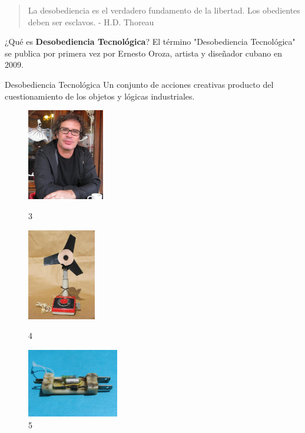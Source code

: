 \documentclass[spanish]{beamer}
\begin{document}
\begin{frame}{}
    \begin{quote}
        La desobediencia es el verdadero fundamento de la libertad. Los obedientes deben ser esclavos. - H.D. Thoreau
    \end{quote}
\end{frame}

\begin{frame}{¿Qué es \textbf{Desobediencia Tecnológica}?}
    El término "Desobediencia Tecnológica" se publica por primera vez por Ernesto Oroza, artista y diseñador cubano en 2009.
    \begin{block}{Desobediencia Tecnológica}
        Un conjunto de acciones creativas producto del cuestionamiento de los objetos y lógicas industriales.    
    \end{block}
    \vspace{0.3cm}
    
    \centering
    \begin{figure}      
            \includegraphics[height=4cm]{img/ernestooroza.jpg}
            \vspace*{-3mm}
            \caption{ 3}
        \endminipage\hfill
            \includegraphics[height=4cm]{img/inventos/ventilador.jpg}
            \vspace*{-3mm}
            \caption{ 4}
        \endminipage\hfill
            \includegraphics[height=3cm]{img/inventos/battery_charger.jpg}
            \vspace*{-3mm}
            \caption{ 5}
        \endminipage\hfill
    \end{figure}    
\end{frame}
\end{document}
